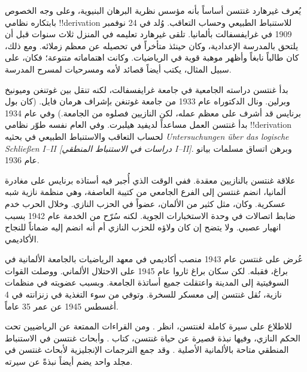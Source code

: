 \documentclass[../../../include/open-logic-section]{subfiles}
\begin{document}



يُعرف غيرهارد غنتسن أساساً بأنه مؤسس نظرية البرهان البنيوية، وعلى وجه
الخصوص بابتكاره نظامي !!{derivation} للاستنباط الطبيعي وحساب التعاقب.
وُلد في 24 نوفمبر 1909 في غرايفسفالت بألمانيا. تلقى غيرهارد تعليمه في
المنزل ثلاث سنوات قبل أن يلتحق بالمدرسة الإعدادية، وكان حينئذ متأخراً في
تحصيله عن معظم زملائه. ومع ذلك، كان طالباً نابغاً وأظهر موهبة قوية في
الرياضيات. وكانت اهتماماته متنوعة؛ فكان، على سبيل المثال، يكتب أيضاً
قصائد لأمه ومسرحيات لمسرح المدرسة.

بدأ غنتسن دراسته الجامعية في جامعة غرايفسفالت، لكنه تنقل بين غوتنغن
وميونيخ وبرلين. ونال الدكتوراه عام 1933 من جامعة غوتنغن بإشراف هرمان
فايل. (كان بول برنايس قد أشرف على معظم عمله، لكن النازيين فصلوه من
الجامعة.) وفي عام 1934 بدأ غنتسن العمل مساعداً لديفيد هيلبرت. وفي العام
نفسه طوّر نظامي !!{derivation} لحساب التعاقب والاستنباط الطبيعي في
بحثيه \emph{Untersuchungen \"{u}ber das logische Schlie\ss en I--II
  [دراسات في الاستنباط المنطقي I--II]}. وبرهن اتساق مسلمات بيانو عام
1936.

علاقة غنتسن بالنازيين معقدة. ففي الوقت الذي أُجبر فيه أستاذه برنايس على
مغادرة ألمانيا، انضم غنتسن إلى الفرع الجامعي من كتيبة العاصفة، وهي منظمة
نازية شبه عسكرية. وكان، مثل كثير من الألمان، عضواً في الحزب النازي. وخلال
الحرب خدم ضابط اتصالات في وحدة الاستخبارات الجوية. لكنه سُرّح من الخدمة
عام 1942 بسبب انهيار عصبي. ولا يتضح إن كان ولاؤه للحزب النازي أم أنه انضم
إليه ضماناً للنجاح الأكاديمي.

عُرض على غنتسن عام 1943 منصب أكاديمي في معهد الرياضيات بالجامعة الألمانية
في براغ، فقبله. لكن سكان براغ ثاروا عام 1945 على الاحتلال الألماني. ووصلت
القوات السوفيتية إلى المدينة واعتقلت جميع أساتذة الجامعة. وبسبب عضويته في
منظمات نازية، نُقل غنتسن إلى معسكر للسخرة. وتوفي من سوء التغذية في زنزانته
في 4 أغسطس 1945 عن عمر 35 عاماً.

\begin{reading}
للاطلاع على سيرة كاملة لغنتسن، انظر \citet{Menzler-Trott2007}. ومن
القراءات الممتعة عن الرياضيين تحت الحكم النازي، وفيها نبذة قصيرة عن حياة
غنتسن، كتاب \citet{Segal2014}. وأبحاث غنتسن في الاستنباط المنطقي متاحة
بالألمانية الأصلية \citep{Gentzen1935a,Gentzen1935b}. وقد جمع
\citet{Gentzen1969} الترجمات الإنجليزية لأبحاث غنتسن في مجلد واحد يضم
أيضاً نبذةً عن سيرته.
\end{reading}
\end{document}
